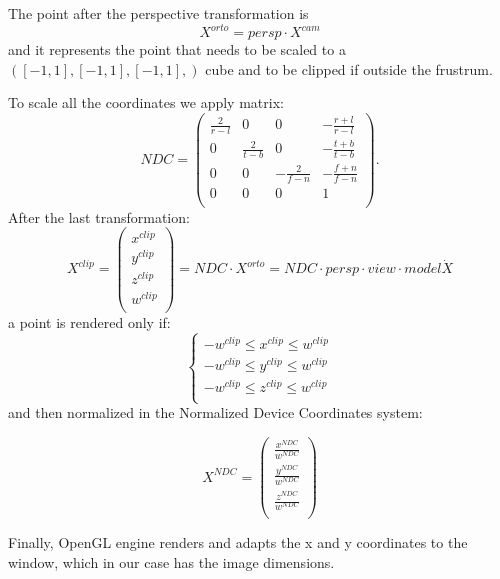 The point after the perspective transformation is
\begin{equation}
 X^{orto} = persp \cdot X^{cam}
\end{equation}
and it represents the point that needs to be scaled to a $([-1,1],[-1,1],[-1,1],)$ cube and to be clipped if outside the frustrum.

To scale all the coordinates we apply matrix:
\begin{equation}
 NDC =
 \begin{pmatrix}
  \frac{2}{r-l}   &             0   & 0               & -\frac{r+l}{r-l}\\
  0               & \frac{2}{t-b}  & 0               & -\frac{t+b}{t-b}\\
  0               & 0               & -\frac{2}{f-n}  & -\frac{f+n}{f-n}\\
  0               & 0               & 0               & 1\\
 \end{pmatrix}.
\end{equation}
After the last transformation:
\begin{equation}
 X^{clip} = 
 \begin{pmatrix}
  x^{clip}\\
  y^{clip}\\
  z^{clip}\\
  w^{clip}\\
 \end{pmatrix}
 = NDC \cdot X^{orto} = NDC \cdot persp \cdot view \cdot model \dot X
\end{equation}
a point is rendered  only if:
\begin{equation}
 \begin{cases}
  -w^{clip} \leq x^{clip} \leq w^{clip}\\
  -w^{clip} \leq y^{clip} \leq w^{clip}\\
  -w^{clip} \leq z^{clip} \leq w^{clip}\\
 \end{cases}
\end{equation}
and then normalized in the Normalized Device Coordinates system:

\begin{equation}
 X^{NDC} = 
 \begin{pmatrix}
  \frac{x^{NDC}}{w^{NDC}}\\
  \frac{y^{NDC}}{w^{NDC}}\\
  \frac{z^{NDC}}{w^{NDC}}\\
 \end{pmatrix}
\end{equation}


Finally, OpenGL engine renders and adapts the x and y coordinates to the window, which in our case has the image dimensions.








